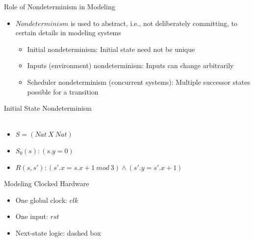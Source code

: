 \documentclass{beamer}
\begin{document}
\begin{frame}{Role of Nondeterminism in Modeling}
\begin{itemize}
\item<1-> $Nondeterminism$ is used to abstract, i.e., not deliberately committing, to certain details in modeling systems
\begin{itemize}
\item<2-> Initial nondeterminism: Initial state need not be unique

\item<3-> Inputs (environment) nondeterminism: Inputs can change arbitrarily

\item<4-> Scheduler nondeterminism (concurrent systems): Multiple successor states possible for a transition

\end{itemize}
\end{itemize}
\end{frame}

\begin{frame}{Initial State Nondeterminism}
 \\
 \\
\begin{itemize}
\item<3-> $S = (Nat~X~Nat)$
\item<3-> $S_0(s): (s.y = 0)$
\item<3-> $R(s,s'): (s'.x = s.x+1~mod~3) \land (s'.y = s'.x + 1) $
\end{itemize}
\end{frame}

\begin{frame}{Modeling Clocked Hardware}
\begin{itemize}
\item One global clock: $clk$

\item One input: $rst$

\item Next-state logic: dashed box
\end{itemize}
\end{frame}
\end{document}

